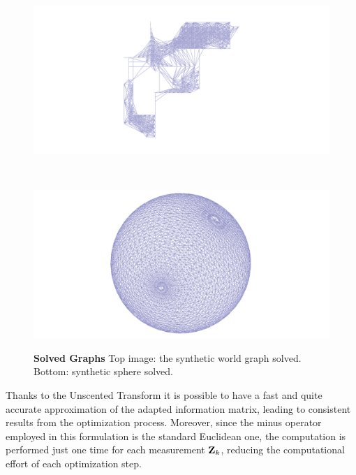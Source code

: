 \begin{figure}[!hbt]
    \centering
    \begin{minipage}[t!]{0.9\textwidth}
        \centering
        \includegraphics[width=\textwidth]{figures/04_solvingSe3/viewer_500p.png}
        \subcaption{}
        \label{fig:500p_solved}
    \end{minipage}\\
    \begin{minipage}[t!]{0.9\textwidth}
        \centering
        \includegraphics[width=\textwidth]{figures/04_solvingSe3/viewer_sphere.png}
        \subcaption{}
        \label{fig:sphere_solved}
    \end{minipage}%
    
    \caption{\textbf{Solved Graphs} Top image: the synthetic world graph solved. Bottom: synthetic sphere solved.} 
    \label{fig:solved_graphs}
\end{figure}

Thanks to the Unscented Transform it is possible to have a fast and quite accurate approximation of the adapted information matrix, leading to consistent results from the optimization process. Moreover, since the minus operator employed in this formulation is the standard Euclidean one, the computation is performed just one time for each measurement $\mathbf{Z}_{k}$, reducing the computational effort of each optimization step.


